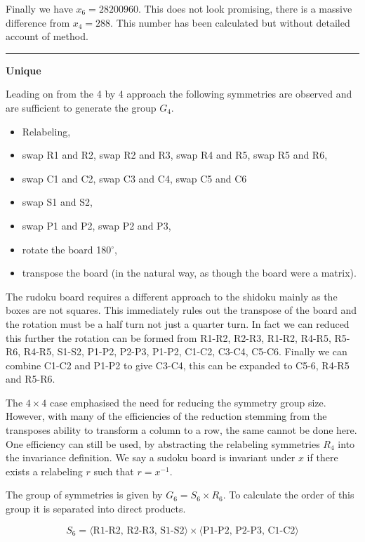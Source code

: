 \documentclass[a4paper,11pt]{report}
\newcounter{row}
\newcounter{col}
\begin{document}
Finally we have $x_6=28200960$. This does not look promising, there is a massive difference from $x_4=288$. This number has been calculated but without detailed account of method. 

\noindent\rule{4cm}{0.4pt}

\textbf{Unique}

Leading on from the 4 by 4 approach the following symmetries are observed and are sufficient to generate the group $G_4$.
\begin{itemize}
\item Relabeling,
\item swap R1 and R2, swap R2 and R3, swap R4 and R5, swap R5 and R6,
\item swap C1 and C2, swap C3 and C4, swap C5 and C6
\item swap S1 and S2,
\item swap P1 and P2, swap P2 and P3,
\item rotate the board 180$^\circ$,
\item transpose the board (in the natural way, as though the board were a matrix).
\end{itemize}
The rudoku board requires a different approach to the shidoku mainly as the boxes are not squares. This immediately rules out the transpose of the board and the rotation must be a half turn not just a quarter turn. In fact we can reduced this further the rotation can be formed from R1-R2, R2-R3, R1-R2, R4-R5, R5-R6, R4-R5, S1-S2, P1-P2, P2-P3, P1-P2, C1-C2, C3-C4, C5-C6. Finally we can combine C1-C2 and P1-P2 to give C3-C4, this can be expanded to C5-6, R4-R5 and R5-R6.

The $4\times 4$ case emphasised the need for reducing the symmetry group size. However, with many of the efficiencies of the reduction stemming from the transposes ability to transform a column to a row, the same cannot be done here. One efficiency can still be used, by abstracting the relabeling symmetries $R_4$ into the invariance definition. We say a sudoku board is invariant under $x$ if there exists a relabeling $r$ such that $r=x^{-1}$. 

The group of symmetries is given by $G_6=S_6\times R_6$. To calculate the order of this group it is separated into direct products. 

\begin{equation}
S_6=\langle\text{R1-R2, R2-R3, S1-S2}\rangle\times \langle\text{P1-P2, P2-P3, C1-C2}\rangle 
\end{equation}
\end{document}
